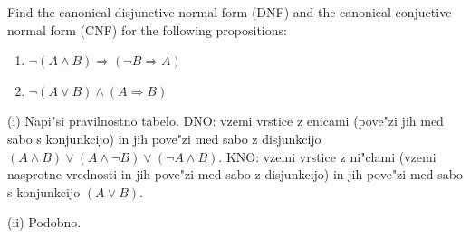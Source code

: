 \documentclass[11pt,paper=b5,footinclude,headinclude]{scrbook} %
\newtheorem{ex}{Vaja\hypertarget{sol:\theex}}[chapter]
\begin{document}
\begin{ex}


\end{ex} \begin{ex} Find the canonical disjunctive normal form (DNF) and the canonical conjuctive normal form (CNF) for the following propositions:
\begin{enumerate}
\item[(i)] $\neg(A\wedge B) \Rightarrow (\neg B \Rightarrow A)$
\item[(ii)] $\neg (A\vee B) \wedge (A \Rightarrow B)$
\end{enumerate}
\begin{sol}

(i) Napi"si pravilnostno tabelo. DNO: vzemi vrstice z enicami (pove"zi jih med sabo s konjunkcijo) in jih pove"zi med sabo z disjunkcijo
$(A\wedge B) \vee (A\wedge \neg B) \vee (\neg A \wedge B)$. KNO: vzemi vrstice z ni"clami (vzemi nasprotne vrednosti in jih pove"zi med sabo z disjunkcijo) in jih pove"zi med sabo s konjunkcijo $(A \vee B)$. 

(ii) Podobno.
\end{sol}
\end{ex} 
\end{document}
